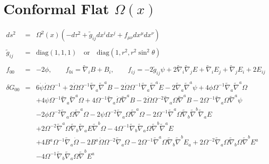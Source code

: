 \documentclass[10pt,letterpaper]{article}
\numberwithin{equation}{section}
\begin{document}
%
%
%
%
\section{Conformal Flat $\Omega(x)$}
% 
%
\begin{eqnarray}
ds^2 &=& \Omega^2(x)(-d\tau^2 + \tilde g_{ij} dx^i dx^j + f_{\mu\nu} dx^\mu dx^\nu)
\\ \nonumber\\
\tilde g_{ij} &=& \text{diag}(1,1,1)\quad\text{or}\quad \text{diag}(1,r^2,r^2\sin^2\theta)
\\ \nonumber\\
f_{00} &=& -2\phi,\qquad f_{0i}= \tilde \nabla_i B + B_i,\qquad 
f_{ij} = -2 \tilde g_{ij}\psi + 2\tilde\nabla_i\tilde \nabla_j E + \tilde \nabla_i E_j + \tilde \nabla_j E_i + 2E_{ij}
\\ \nonumber\\
\delta G_{00} &=& 
6 \dot{\psi} \dot{\Omega} \Omega^{-1}
+ 2 \dot{\Omega} \Omega^{-1} \tilde{\nabla}_{a}\tilde{\nabla}^{a}B
- 2 \dot{\Omega} \Omega^{-1} \tilde{\nabla}_{a}\tilde{\nabla}^{a}\dot{E}
- 2 \tilde{\nabla}_{a}\tilde{\nabla}^{a}\psi
+ 4 \phi \Omega^{-1} \tilde{\nabla}_{a}\tilde{\nabla}^{a}\Omega\nonumber\\
&& + 4 \psi \Omega^{-1} \tilde{\nabla}_{a}\tilde{\nabla}^{a}\Omega
+ 4 \Omega^{-1} \tilde{\nabla}_{a}\dot{\Omega} \tilde{\nabla}^{a}B
- 2 \dot{\Omega} \Omega^{-2} \tilde{\nabla}_{a}\Omega \tilde{\nabla}^{a}B
- 2 \Omega^{-1} \tilde{\nabla}_{a}\Omega \tilde{\nabla}^{a}\psi\nonumber\\
&& - 2 \phi \Omega^{-2} \tilde{\nabla}_{a}\Omega \tilde{\nabla}^{a}\Omega
- 2 \psi \Omega^{-2} \tilde{\nabla}_{a}\Omega \tilde{\nabla}^{a}\Omega
- 2 \Omega^{-1} \tilde{\nabla}^{a}\Omega \tilde{\nabla}_{b}\tilde{\nabla}^{b}\tilde{\nabla}_{a}E\nonumber\\
&& + 2 \Omega^{-2} \tilde{\nabla}^{a}\Omega \tilde{\nabla}_{b}\tilde{\nabla}_{a}E \tilde{\nabla}^{b}\Omega
- 4 \Omega^{-1} \tilde{\nabla}_{b}\tilde{\nabla}_{a}\Omega \tilde{\nabla}^{b}\tilde{\nabla}^{a}E
\nonumber\\
&&+4 B^{a} \Omega^{-1} \tilde{\nabla}_{a}\dot{\Omega}
- 2 B^{a} \dot{\Omega} \Omega^{-2} \tilde{\nabla}_{a}\Omega
- 2 \Omega^{-1} \tilde{\nabla}^{a}\Omega \tilde{\nabla}_{b}\tilde{\nabla}^{b}E_{a}
+ 2 \Omega^{-2} \tilde{\nabla}_{a}\Omega \tilde{\nabla}_{b}\Omega \tilde{\nabla}^{b}E^{a}\nonumber\\
&& - 4 \Omega^{-1} \tilde{\nabla}_{b}\tilde{\nabla}_{a}\Omega \tilde{\nabla}^{b}E^{a}

\end{eqnarray}
\end{document}
